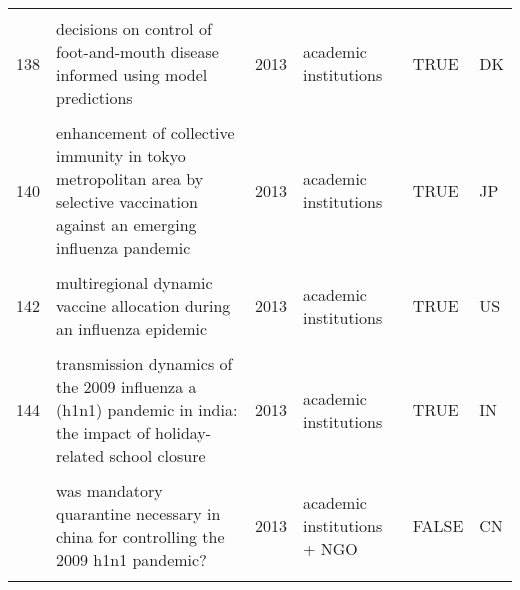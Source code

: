 \documentclass[
]{article}
\begin{document}
\begin{landscape}
\begin{longtable}{l>{\raggedright\arraybackslash}p{4cm}l>{\raggedright\arraybackslash}p{3.5cm}l>{\raggedright\arraybackslash}p{1.5cm}}
\cellcolor{gray!6}{137} & \cellcolor{gray!6}{cost-effectiveness of workplace closure and travel restriction for mitigating influenza outbreaks: a network-based simulation} & \cellcolor{gray!6}{2013} & \cellcolor{gray!6}{academic institutions} & \cellcolor{gray!6}{TRUE} & \cellcolor{gray!6}{none}\\
138 & decisions on control of foot-and-mouth disease informed using model predictions & 2013 & academic institutions & TRUE & DK\\
\cellcolor{gray!6}{139} & \cellcolor{gray!6}{dengue in cape verde: vector control and vaccination} & \cellcolor{gray!6}{2013} & \cellcolor{gray!6}{academic institutions} & \cellcolor{gray!6}{TRUE} & \cellcolor{gray!6}{CV}\\
140 & enhancement of collective immunity in tokyo metropolitan area by selective vaccination against an emerging influenza pandemic & 2013 & academic institutions & TRUE & JP\\
\addlinespace
\cellcolor{gray!6}{141} & \cellcolor{gray!6}{estimated impact of aggressive empirical antiviral treatment in containing an outbreak of pandemic influenza h1n1 in an isolated first nations community} & \cellcolor{gray!6}{2013} & \cellcolor{gray!6}{academic institutions + government institutions} & \cellcolor{gray!6}{FALSE} & \cellcolor{gray!6}{CA}\\
142 & multiregional dynamic vaccine allocation during an influenza epidemic & 2013 & academic institutions & TRUE & US\\
\cellcolor{gray!6}{143} & \cellcolor{gray!6}{policies to reduce influenza in the workplace: impact assessments using an agent-based model} & \cellcolor{gray!6}{2013} & \cellcolor{gray!6}{academic institutions} & \cellcolor{gray!6}{TRUE} & \cellcolor{gray!6}{US}\\
144 & transmission dynamics of the 2009 influenza a (h1n1) pandemic in india: the impact of holiday-related school closure & 2013 & academic institutions & TRUE & IN\\
\cellcolor{gray!6}{145} & \cellcolor{gray!6}{vaccination against foot-and-mouth disease: do initial conditions affect its benefit?} & \cellcolor{gray!6}{2013} & \cellcolor{gray!6}{academic institutions} & \cellcolor{gray!6}{TRUE} & \cellcolor{gray!6}{GB}\\
\addlinespace
146 & was mandatory quarantine necessary in china for controlling the 2009 h1n1 pandemic? & 2013 & academic institutions + NGO & FALSE & CN\\
\cellcolor{gray!6}{147} & \cellcolor{gray!6}{a contact-network-based simulation model for evaluating interventions under 'what-if' scenarios in epidemic} & \cellcolor{gray!6}{2012} & \cellcolor{gray!6}{academic institutions} & \cellcolor{gray!6}{TRUE} & \cellcolor{gray!6}{SG}\\

\end{longtable}
\end{landscape}
\end{document}
